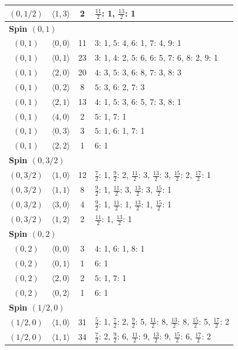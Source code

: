 \begin{longtable}{c c c p{8.8cm}}
$(0,1/2)$ & $\langle 1,3\rangle$ & 2 & $\frac{11}{2}$: 1, $\frac{13}{2}$: 1 \\
\midrule
\multicolumn{4}{l}{\textbf{Spin $(0,1)$}}\\
$(0,1)$ & $\langle 0,0\rangle$ & 11 & $3$: 1, $5$: 4, $6$: 1, $7$: 4, $9$: 1 \\
$(0,1)$ & $\langle 0,1\rangle$ & 23 & $3$: 1, $4$: 2, $5$: 6, $6$: 5, $7$: 6, $8$: 2, $9$: 1 \\
$(0,1)$ & $\langle 2,0\rangle$ & 20 & $4$: 3, $5$: 3, $6$: 8, $7$: 3, $8$: 3 \\
$(0,1)$ & $\langle 0,2\rangle$ & 8 & $5$: 3, $6$: 2, $7$: 3 \\
$(0,1)$ & $\langle 2,1\rangle$ & 13 & $4$: 1, $5$: 3, $6$: 5, $7$: 3, $8$: 1 \\
$(0,1)$ & $\langle 4,0\rangle$ & 2 & $5$: 1, $7$: 1 \\
$(0,1)$ & $\langle 0,3\rangle$ & 3 & $5$: 1, $6$: 1, $7$: 1 \\
$(0,1)$ & $\langle 2,2\rangle$ & 1 & $6$: 1 \\
\midrule
\multicolumn{4}{l}{\textbf{Spin $(0,3/2)$}}\\
$(0,3/2)$ & $\langle 1,0\rangle$ & 12 & $\frac{7}{2}$: 1, $\frac{9}{2}$: 2, $\frac{11}{2}$: 3, $\frac{13}{2}$: 3, $\frac{15}{2}$: 2, $\frac{17}{2}$: 1 \\
$(0,3/2)$ & $\langle 1,1\rangle$ & 8 & $\frac{9}{2}$: 1, $\frac{11}{2}$: 3, $\frac{13}{2}$: 3, $\frac{15}{2}$: 1 \\
$(0,3/2)$ & $\langle 3,0\rangle$ & 4 & $\frac{9}{2}$: 1, $\frac{11}{2}$: 1, $\frac{13}{2}$: 1, $\frac{15}{2}$: 1 \\
$(0,3/2)$ & $\langle 1,2\rangle$ & 2 & $\frac{11}{2}$: 1, $\frac{13}{2}$: 1 \\
\midrule
\multicolumn{4}{l}{\textbf{Spin $(0,2)$}}\\
$(0,2)$ & $\langle 0,0\rangle$ & 3 & $4$: 1, $6$: 1, $8$: 1 \\
$(0,2)$ & $\langle 0,1\rangle$ & 1 & $6$: 1 \\
$(0,2)$ & $\langle 2,0\rangle$ & 2 & $5$: 1, $7$: 1 \\
$(0,2)$ & $\langle 0,2\rangle$ & 1 & $6$: 1 \\
\midrule
\multicolumn{4}{l}{\textbf{Spin $(1/2,0)$}}\\
$(1/2,0)$ & $\langle 1,0\rangle$ & 31 & $\frac{5}{2}$: 1, $\frac{7}{2}$: 2, $\frac{9}{2}$: 5, $\frac{11}{2}$: 8, $\frac{13}{2}$: 8, $\frac{15}{2}$: 5, $\frac{17}{2}$: 2 \\
$(1/2,0)$ & $\langle 1,1\rangle$ & 34 & $\frac{7}{2}$: 2, $\frac{9}{2}$: 6, $\frac{11}{2}$: 9, $\frac{13}{2}$: 9, $\frac{15}{2}$: 6, $\frac{17}{2}$: 2 \\

\end{longtable}
